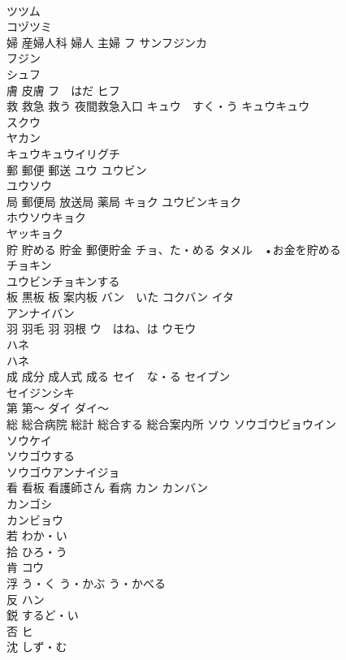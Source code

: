 \documentclass[8pt]{extreport}
\begin{document}
\begin{CJK}{UTF8}{min}
\\	ツツム 
\\	コヅツミ 
\\	婦 産婦人科 婦人 主婦	フ サンフジンカ
\\	フジン 
\\	シュフ 
\\	膚 皮膚	フ　はだ ヒフ 
\\	救 救急 救う 夜間救急入口	キュウ　すく・う キュウキュウ 
\\	スクウ 
\\	ヤカン
\\	キュウキュウイリグチ
\\	郵 郵便 郵送	ユウ ユウビン 
\\	ユウソウ 
\\	局 郵便局 放送局 薬局	キョク ユウビンキョク 
\\	ホウソウキョク 
\\	ヤッキョク 
\\	貯 貯める 貯金 郵便貯金	チョ、た・める タメル　•お金を貯める 
\\	チョキン 
\\	ユウビンチョキンする 
\\	板 黒板 板 案内板	バン　いた コクバン イタ 
\\	アンナイバン 
\\	羽 羽毛 羽 羽根	ウ　はね、は ウモウ 
\\	ハネ 
\\	ハネ 
\\	成 成分 成人式 成る	セイ　な・る セイブン 
\\	セイジンシキ 
\\	第 第〜	ダイ ダイ〜 
\\	総 総合病院 総計 総合する 総合案内所	ソウ ソウゴウビョウイン 
\\	ソウケイ 
\\	ソウゴウする　
\\	ソウゴウアンナイジョ　
\\	看 看板 看護師さん 看病	カン カンバン 
\\	カンゴシ 
\\	カンビョウ 
\\	若	わか・い
\\	拾	ひろ・う
\\	肯	コウ
\\	浮	う・く う・かぶ う・かべる
\\	反	ハン
\\	鋭	するど・い
\\	否	ヒ
\\	沈	しず・む

\end{CJK}
\end{document}
